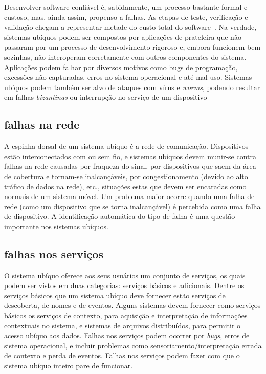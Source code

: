 Desenvolver software confiável é, sabidamente, um processo bastante formal e custoso, mas, ainda assim, propenso a falhas. As etapas de teste, verificação e validação chegam a representar metade do custo total do software~\cite{hailpern2002software}. Na verdade, sistemas ubíquos podem ser compostos por aplicações de prateleira que não passaram por um processo de desenvolvimento rigoroso e, embora funcionem bem sozinhas, não interoperam corretamente com outros componentes do sistema. Aplicações podem falhar por diversos motivos como bugs de programação, excessões não capturadas, erros no sistema operacional e até mal uso. Sistemas ubíquos podem também ser alvo de ataques com vírus e \emph{worms}, podendo resultar em falhas \emph{bizantinas} ou interrupção no serviço de um dispositivo


\subsection{falhas na rede} %
\label{sub:falhas_na_rede}

A espinha dorsal de um sistema ubíquo é a rede de comunicação. Dispositivos estão interconectados com ou sem fio, e sistemas ubíquos devem munir-se contra falhas na rede causadas por fraqueza do sinal, por dispositivos que saem da área de cobertura e tornam-se inalcançáveis, por congestionamento (devido ao alto tráfico de dados na rede), etc., situações estas que devem ser encaradas como normais de um sistema móvel. Um problema maior ocorre quando uma falha de rede (como um dispositivo que se torna inalcançável) é percebida como uma falha de dispositivo. A identificação automática do tipo de falha é uma questão importante nos sistemas ubíquos.


\subsection{falhas nos serviços} %
\label{sub:falhas_nos_servicos}
O sistema ubíquo oferece aos seus usuários um conjunto de serviços, os quais podem ser vistos em duas categorias: serviços básicos e adicionais. Dentre os serviços básicos que um sistema ubíquo deve fornecer estão serviços de descoberta, de nomes e de eventos. Alguns sistemas devem fornecer como serviços básicos os serviços de contexto, para aquisição e interpretação de informações contextuais no sistema, e sistemas de arquivos distribuídos, para permitir o acesso ubíquo aos dados. Falhas nos serviços podem ocorrer por \emph{bugs}, erros de sistema operacional, e incluir problemas como sensoriamento/interpretação errada de contexto e perda de eventos. Falhas nos serviços podem fazer com que o sistema ubíquo inteiro pare de funcionar.

